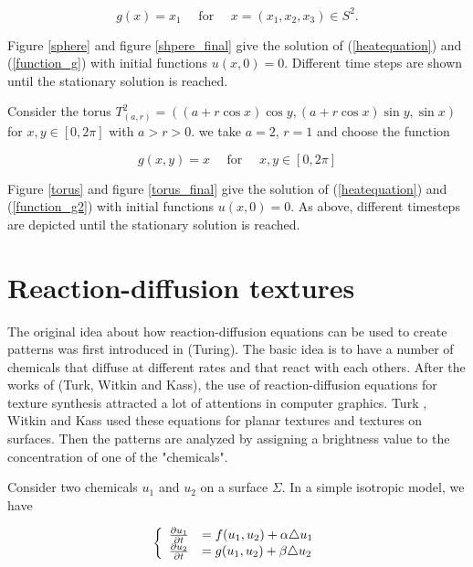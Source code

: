 \documentclass{elsart}
\begin{document}
\begin{equation}\label{function_g}
g(x) = x_1 \mbox{ ~~ for ~~ } x = (x_1,x_2,x_3) \in S^2.
\end{equation}


Figure \ref{sphere} and figure \ref{shpere_final} give the solution
of (\ref{heatequation}) and (\ref{function_g}) with initial
functions $u(x,0) = 0$. Different time steps are shown until the
stationary solution is reached.


Consider  the torus $T^2_{(a,r)} = ( ( a+r \cos x)\cos y, (a+r \cos
x)\sin y, \sin x)$ for $x,y \in [ 0, 2\pi]$ with $a > r > 0$. we
take $ a=2$, $r=1$ and choose the function

\begin{equation}\label{function_g2}
g(x,y) = x  \mbox{ ~~ for ~~ } x,y  \in [0, 2 \pi]
\end{equation}

Figure \ref{torus} and figure \ref{torus_final} give the solution of
(\ref{heatequation}) and (\ref{function_g2}) with initial functions
$u(x,0) = 0$. As above, different timesteps are depicted until the
stationary solution is reached.



\section{Reaction-diffusion textures}

The original idea about how reaction-diffusion equations can be used
to create patterns was first introduced in (Turing\cite{Turing}).
The basic idea is to have a number of chemicals that diffuse at
different rates and that react with each others. After the works of
(Turk\cite{Turk}, Witkin and Kass\cite{Witkin}), the use of
reaction-diffusion equations for texture synthesis attracted a lot
of attentions in computer graphics. Turk , Witkin and Kass used
these equations for planar textures and textures on surfaces. Then
the patterns are analyzed by assigning a brightness value to the
concentration of one of the "chemicals".

Consider two chemicals $u_1$ and $u_2$ on a surface $\Sigma$. In a
simple isotropic model, we have

\begin{equation}\label{Du} \left \{\begin{array}{ll} \frac{\partial u_1}{\partial t} &=f(u_1,u_2)
+ \alpha \triangle u_1 \cr \frac{\partial u_2}{\partial t}
&=g(u_1,u_2) + \beta \triangle u_2\end{array} \right. \end{equation}
\end{document}
